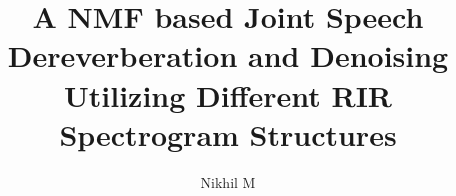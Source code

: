 \documentclass[twoside]{iitbreport}
\begin{document}
	
\setcounter{page}{1}

\title{A NMF based Joint Speech Dereverberation and Denoising Utilizing Different RIR Spectrogram Structures}
\author{Nikhil M}











\maketitle


\dedication[Dedicated to \ldots]        

\end{document}
